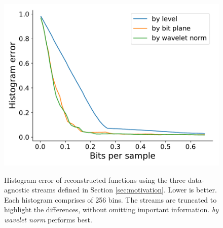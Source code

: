 \begin{figure}
 	{\includegraphics[width=0.48\linewidth]{img/motivation/motivation-histogram-velocityz.pdf}}
 	\caption{Histogram error of reconstructed functions using the three data-agnostic streams defined
 	in Section \ref{sec:motivation}. Lower is better. Each histogram comprises of 256 bins. The
 	streams are truncated to highlight the differences, without omitting important information.
 	\emph{by wavelet norm} performs best.}
 	\label{fig:motivation-histogram}
\end{figure}

